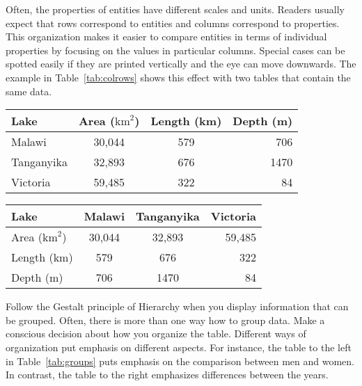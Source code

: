 Often, the properties of entities have different scales and units. Readers usually expect that rows correspond to entities and columns correspond to properties. This organization makes it easier to compare entities in terms of individual properties by focusing on the values in particular columns. Special cases can be spotted easily if they are printed vertically and the eye can move downwards. The example in Table~\ref{tab:colrows} shows this effect with two tables that contain the same data.

\begin{table*}[tb]
  \caption{\label{tab:colrows} The table to the left is easier to read than the table to the right \cite{Carter12}.}
  \centering
  \footnotesize %
  {\renewcommand{\arraystretch}{1.1} %
  \begin{tabularx}{0.45\linewidth}{@{}Xccr@{}} %
    \toprule
    Lake & Area ($\mathrm{km}^2$) & Length (km) & Depth (m)\\
    \midrule
    Malawi & 30,044 & 579 & 706 \\
    Tanganyika & 32,893 & 676 & 1470 \\
    Victoria & 59,485 & 322 & 84\\
    \bottomrule
  \end{tabularx}
  \hspace{\fill}
  \begin{tabularx}{0.45\linewidth}{@{}Xccr@{}} %
    \toprule
    Lake & Malawi & Tanganyika & Victoria\\
    \midrule
    Area ($\mathrm{km}^2$) & 30,044 & 32,893 & 59,485 \\
    Length (km) & 579 & 676 & 322 \\
    Depth (m) & 706 & 1470 & 84\\
    \bottomrule
  \end{tabularx}
  }
\end{table*}

Follow the Gestalt principle of Hierarchy when you display information that can be grouped. Often, there is more than one way how to group data. Make a conscious decision about how you organize the table. Different ways of organization put emphasis on different aspects. For instance, the table to the left in Table~\ref{tab:groups} puts emphasis on the comparison between men and women. In contrast, the table to the right emphasizes differences between the years.

